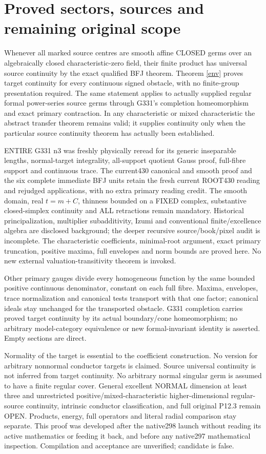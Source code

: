 \documentclass[11pt]{article}
\begin{document}
\section{Proved sectors, sources and remaining original scope}
Whenever all marked source centres are smooth affine CLOSED germs over
an algebraically closed characteristic-zero field, their finite product
has universal source continuity by the exact qualified BFJ theorem.
Theorem \ref{env} proves target continuity for every continuous signed
obstacle, with no finite-group presentation required. The same statement
applies to actually supplied regular formal power-series source germs
through G331's completion homeomorphism and exact primary contraction.
In any characteristic or mixed characteristic the abstract transfer theorem
remains valid; it supplies continuity only when the particular source
continuity theorem has actually been established.

ENTIRE G331 n3 was freshly physically reread for its generic inseparable
lengths, normal-target integrality, all-support quotient Gauss proof,
full-fibre support and continuous trace. The current430 canonical and smooth
proof and the six complete immediate BFJ units retain the fresh current
ROOT430 reading and rejudged applications, with no extra primary reading
credit. The smooth domain, real $t=m+C$, thinness bounded on a FIXED
complex, substantive closed-simplex continuity and ALL retractions remain
mandatory. Historical principalization, multiplier subadditivity, Izumi
and conventional finite/excellence algebra are disclosed background;
the deeper recursive source/book/pixel audit is incomplete.
The characteristic coefficients, minimal-root argument, exact primary
truncation, positive maxima, full envelopes and norm bounds are proved here.
No new external valuation-transitivity theorem is invoked.

Other primary gauges divide every homogeneous function by the same
bounded positive continuous denominator, constant on each full fibre.
Maxima, envelopes, trace normalization and canonical tests transport
with that one factor; canonical ideals stay unchanged for the transported
obstacle. G331 completion carries proved target continuity by its actual
boundary/cone homeomorphism; no arbitrary model-category equivalence or
new formal-invariant identity is asserted. Empty sections are direct.

Normality of the target is essential to the coefficient construction.
No version for arbitrary nonnormal conductor targets is claimed.
Source universal continuity is not inferred from target continuity.
No arbitrary normal singular germ is assumed to have a finite regular
cover. General excellent NORMAL dimension at least three and unrestricted
positive/mixed-characteristic higher-dimensional regular-source continuity,
intrinsic conductor classification, and full original P12.3 remain OPEN.
Products, energy, full operators and literal radial comparison stay separate.
This proof was developed after the native298 launch without reading its
active mathematics or feeding it back, and before any native297 mathematical
inspection. Compilation and acceptance are unverified; candidate is false.
\end{document}
